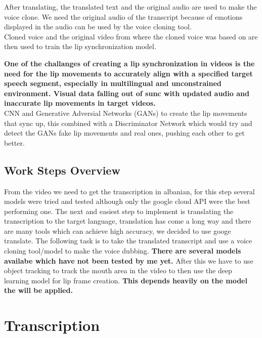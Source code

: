 \documentclass[12pt]{article}
\begin{document}
After translating, the translated text and the original audio are used to make the voice clone. We need the original audio of the transcript because of emotions displayed in the audio can be used by the voice cloning tool.\\
Cloned voice and the original video from where the cloned voice was based on are then used to train the lip synchronization model. 

\textbf{One of the challanges of creating a lip synchronization in videos is the need for the lip movements to accurately align with a specified target speech segment, especially in multilingual and unconstrained environment. Visual data falling out of sunc with updated audio and inaccurate lip movements in target videos.}\\
CNN and Generative Adversial Networks (GANs) to create the lip movements that sync up, this combined with a Discriminator Network which would try and detect the GANs fake lip movements and real ones, pushing each other to get better.

\subsection{Work Steps Overview}

From the video we need to get the transcription in albanian, for this step several models were tried and tested although only the google cloud API were the best performing one. The next and easiest step to implement is translating the transcription to the target language, translation has come a long way and there are many tools which can achieve high accuracy, we decided to use googe translate. The following task is to take the translated transcript and use a voice cloning tool/model to make the voice dubbing. \textbf{There are several models availabe which have not been tested by me yet.} After this we have to use object tracking to track the mouth area in the video to then use the deep learning model for lip frame creation. \textbf{This depends heavily on the model the will be applied.}

\section{Transcription}
\end{document}
